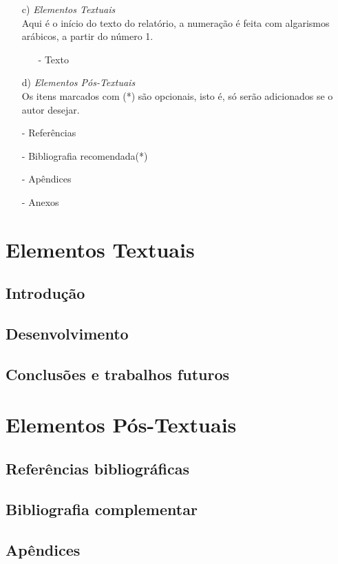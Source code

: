 \documentclass[pnumromarab, normaltoc, a4paper, 12pt]{abnt-unochapeco}
\begin{document}
\begin{itemize}
  \leading{5mm}
  \item [c)] \emph{Elementos Textuais} \\
  Aqui é o início do texto do relatório, a numeração é feita com algarismos
  arábicos, a partir do número 1.

  \begin{itemize}
    \item [-] Texto
  \end{itemize}

  \item [d)] \emph{Elementos Pós-Textuais} \\
  Os itens marcados com (*) são opcionais, isto é, só serão adicionados se o
  autor desejar.
  \item [-] Referências
  \item [-] Bibliografia recomendada(*)
  \item [-] Apêndices
  \item [-] Anexos
\end{itemize}

\section{Elementos Textuais}

\subsection{Introdução}
\subsection{Desenvolvimento}
\subsection{Conclusões e trabalhos futuros}
\section{Elementos Pós-Textuais}
\subsection{Referências bibliográficas}
\subsection{Bibliografia complementar}
\subsection{Apêndices}
\end{document}

